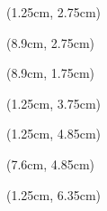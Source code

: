 \begin{textblock*}{7.3cm}(1.25cm, 2.75cm)
    \Name
\end{textblock*}
\begin{textblock*}{4.4cm}(8.9cm, 2.75cm)
    \Alias
\end{textblock*}


\begin{textblock*}{4.4cm}(8.9cm, 1.75cm)
    \Crew
\end{textblock*}


\begin{textblock*}{12cm}(1.25cm, 3.75cm)
    \Looks
\end{textblock*}


\begin{textblock*}{6cm}(1.25cm, 4.85cm)
    \HeritageText
\end{textblock*}


\begin{textblock*}{5.7cm}(7.6cm, 4.85cm)
    \BackgroundText
\end{textblock*}


\begin{textblock*}{12cm}(1.25cm, 6.35cm)
    \VicePurveyor
\end{textblock*}



